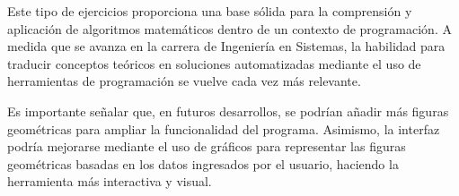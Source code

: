 Este tipo de ejercicios proporciona una base sólida para la comprensión y aplicación de algoritmos matemáticos dentro de un contexto de programación. A medida que se avanza en la carrera de Ingeniería en Sistemas, la habilidad para traducir conceptos teóricos en soluciones automatizadas mediante el uso de herramientas de programación se vuelve cada vez más relevante.

Es importante señalar que, en futuros desarrollos, se podrían añadir más figuras geométricas para ampliar la funcionalidad del programa. Asimismo, la interfaz podría mejorarse mediante el uso de gráficos para representar las figuras geométricas basadas en los datos ingresados por el usuario, haciendo la herramienta más interactiva y visual.